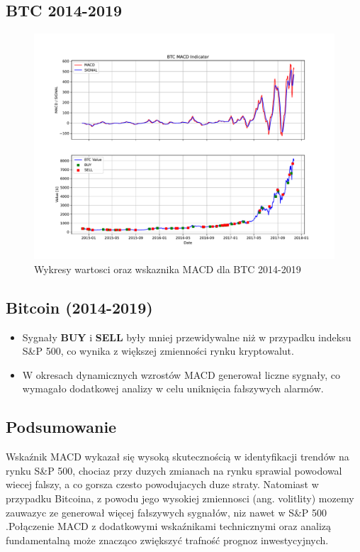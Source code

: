 \documentclass[12pt, letterpaper]{article}
\begin{document}
\subsection{BTC 2014-2019}
\begin{figure}[h!]
    \centering
    \includegraphics[width=\linewidth]{MACD BTC from 0.pdf}
    \caption{Wykresy wartosci oraz wskaznika MACD dla BTC 2014-2019}
    \label{fig:BTC_2014_2017}
\end{figure}

\subsection*{Bitcoin (2014-2019)}
\begin{itemize}
\item Sygnały \textbf{BUY} i \textbf{SELL} były mniej przewidywalne niż w przypadku indeksu S\&P 500, co wynika z większej zmienności rynku kryptowalut.
\item W okresach dynamicznych wzrostów MACD generował liczne sygnały, co wymagało dodatkowej analizy w celu uniknięcia fałszywych alarmów.
\end{itemize}


\vspace{5cm}  %
\subsection*{Podsumowanie}
Wskaźnik MACD wykazał się wysoką skutecznością w identyfikacji trendów na rynku S\&P 500, chociaz przy duzych zmianach na rynku sprawial powodowal wiecej falszy, a co gorsza czesto powodujacych duze straty. Natomiast w przypadku Bitcoina, z powodu jego wysokiej zmiennosci (ang. volitlity) mozemy zauwazyc ze  generował więcej fałszywych sygnałów, niz nawet w S\&P 500 .Połączenie MACD z dodatkowymi wskaźnikami technicznymi oraz analizą fundamentalną może znacząco zwiększyć trafność prognoz inwestycyjnych.
\end{document}
